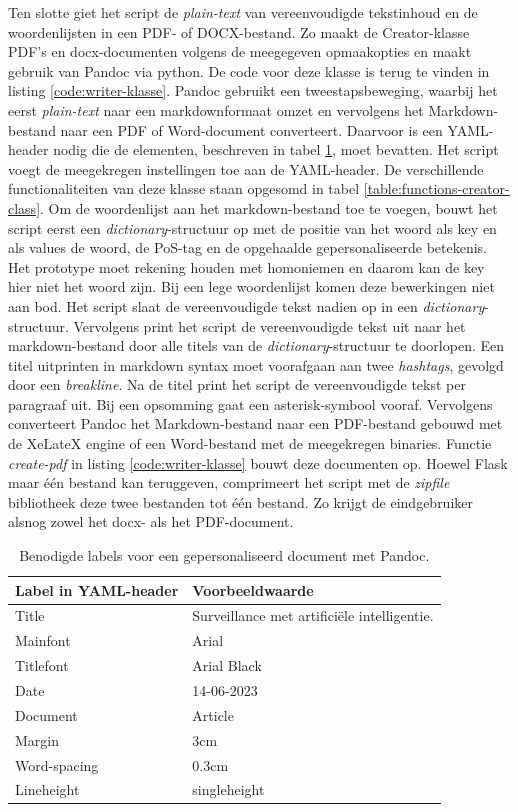 Ten slotte giet het script de \textit{plain-text} van vereenvoudigde tekstinhoud en de woordenlijsten in een PDF- of DOCX-bestand. Zo maakt de Creator-klasse PDF's en docx-documenten volgens de meegegeven opmaakopties en maakt gebruik van Pandoc via python. De code voor deze klasse is terug te vinden in listing \ref{code:writer-klasse}. Pandoc gebruikt een tweestapsbeweging, waarbij het eerst \textit{plain-text} naar een markdownformaat omzet en vervolgens het Markdown-bestand naar een PDF of Word-document converteert. Daarvoor is een YAML-header nodig die de elementen, beschreven in tabel \ref{table:personalized-pdf-word-document-with-pandoc}, moet bevatten. Het script voegt de meegekregen instellingen toe aan de YAML-header. De verschillende functionaliteiten van deze klasse staan opgesomd in tabel \ref{table:functions-creator-class}. Om de woordenlijst aan het markdown-bestand toe te voegen, bouwt het script eerst een \textit{dictionary}-structuur op met de positie van het woord als key en als values de woord, de PoS-tag en de opgehaalde gepersonaliseerde betekenis. Het prototype moet rekening houden met homoniemen en daarom kan de key hier niet het woord zijn. Bij een lege woordenlijst komen deze bewerkingen niet aan bod. Het script slaat de vereenvoudigde tekst nadien op in een \textit{dictionary}-structuur. Vervolgens print het script de vereenvoudigde tekst uit naar het markdown-bestand door alle titels van de \textit{dictionary}-structuur te doorlopen. Een titel uitprinten in markdown syntax moet voorafgaan aan twee \textit{hashtags}, gevolgd door een \textit{breakline}. Na de titel print het script de vereenvoudigde tekst per paragraaf uit. Bij een opsomming gaat een asterisk-symbool vooraf. Vervolgens converteert Pandoc het Markdown-bestand naar een PDF-bestand gebouwd met de XeLateX engine of een Word-bestand met de meegekregen binaries. Functie \textit{create-pdf} in listing \ref{code:writer-klasse} bouwt deze documenten op. Hoewel Flask maar één bestand kan teruggeven, comprimeert het script met de \textit{zipfile} bibliotheek deze twee bestanden tot één bestand. Zo krijgt de eindgebruiker alsnog zowel het docx- als het PDF-document. 

\begin{table}[H]
	\begin{tabular}{ | m{5cm}| m{5cm} | }
		\hline
		\textbf{Label in YAML-header} & \textbf{Voorbeeldwaarde} \\ \hline
		Title & Surveillance met artificiële intelligentie. \\ \hline
		Mainfont & Arial \\ \hline 
		Titlefont & Arial Black \\ \hline
		Date & 14-06-2023 \\ \hline 
		Document & Article \\ \hline
		Margin & 3cm \\ \hline
		Word-spacing & 0.3cm \\ \hline 
		Lineheight & singleheight \\ \hline
	\end{tabular}
	\caption{Benodigde labels voor een gepersonaliseerd document met Pandoc.}
	\label{table:personalized-pdf-word-document-with-pandoc}
\end{table}

